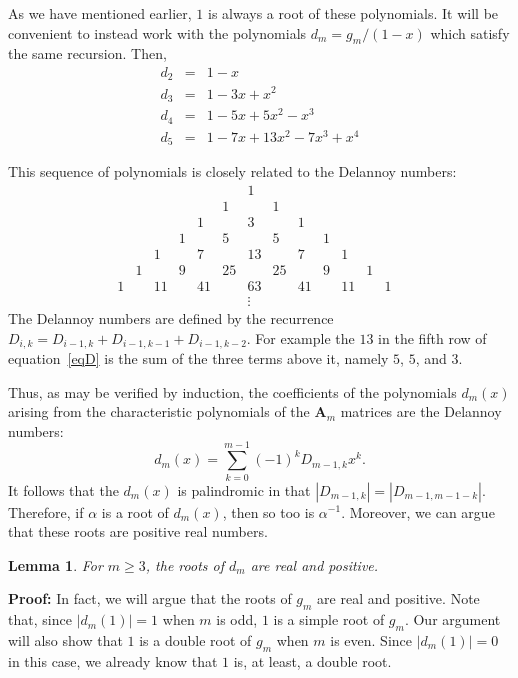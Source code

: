 \documentclass{amsart}
\newtheorem{lemma}[thm]{Lemma}
\begin{document}
As we have mentioned earlier, $1$ is always a root of these polynomials. 
It will be convenient to instead work with the polynomials 
$d_{m} = g_m/(1-x)$ which satisfy the same recursion. Then,
\begin{eqnarray*}
d_2 &=& 1 -x\\
d_3 &=& 1-3x + x^2\\
d_4 &=& 1-5x + 5x^2 - x^3 \\
d_5 &=& 1 -7x +13x^2 - 7x^3 + x^4
\end{eqnarray*}

This sequence of polynomials is closely related to the Delannoy numbers:
\begin{equation}\label{eqD}
\begin{array}{cccccccccccccc}
   & &  &  &  &  & 1 &  &  &  &  &  &  &  \\
   &  &  &  &  & 1 &  & 1 &  &  &  &  &  &  \\
   &  & &  & 1 &  & 3 &  & 1 &  &  &  &  &  \\
   &  &  & 1 &  & 5 &  & 5 &  & 1 &  &  &  &  \\
   &  & 1 &  & 7 &  & 13 &  & 7 &  & 1 &  &  &  \\
   & 1 &  & 9 &  & 25 &  & 25 &  & 9 &  & 1 &  &  \\
  1 &  & 11 &  & 41 &  & 63 &  & 41 &  & 11 &  & 1 &  \\
&&&&&&\vdots&&&&&&&
\end{array}
\end{equation}
The Delannoy numbers are defined by the recurrence
$D_{i,k} = D_{i-1,k} + D_{i-1,k-1} + D_{i-1,k-2}$. For example the $13$ in the fifth row of equation~\ref{eqD} is the sum of the three terms above it, namely $5$, $5$, and $3$. 

Thus, as may be verified by induction, the coefficients of the
polynomials $d_m(x)$ arising from the characteristic polynomials
of the ${{\mathbf A}}_m$ matrices are the Delannoy numbers:
$$d_m(x) = \sum_{k=0}^{m-1} (-1)^k D_{m-1,k} x^k.$$
It follows that the $d_m(x)$ is
palindromic in that $|D_{m-1,k}| = |D_{m-1,m-1-k}|$. Therefore, 
if $\alpha$ is a root of $d_{m}(x)$, then so too is $\alpha^{-1}$.
Moreover, we can argue that these roots are positive real numbers.

\begin{lemma} \label{lemapos}
For $m \geq 3$, the roots of $d_m$ are real and positive.  
\end{lemma}

{\noindent \textbf{Proof: }}
In fact, we will argue that the roots of $g_m$ are real and positive. 
Note that,
since $|d_m(1)|=1$ when $m$ is odd, $1$ is a simple root of
$g_m$. Our argument will also show that $1$ is a double root
of $g_m$ when $m$ is even. Since $|d_m(1)|=0$ in this case,
we already know that $1$ is, at least, a double root.
\end{document}
